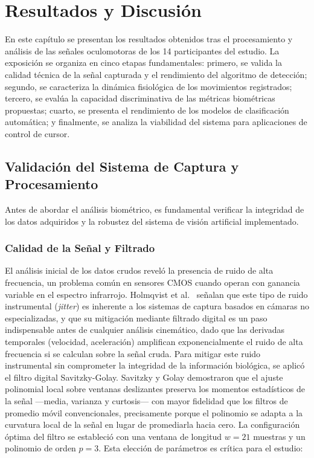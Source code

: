 \chapter{Resultados y Discusión}

En este capítulo se presentan los resultados obtenidos tras el procesamiento y análisis de las señales oculomotoras de los 14 participantes del estudio.
La exposición se organiza en cinco etapas fundamentales: primero, se valida la calidad técnica de la señal capturada y el rendimiento del algoritmo de detección;
segundo, se caracteriza la dinámica fisiológica de los movimientos registrados;
tercero, se evalúa la capacidad discriminativa de las métricas biométricas propuestas;
cuarto, se presenta el rendimiento de los modelos de clasificación automática;
y finalmente, se analiza la viabilidad del sistema para aplicaciones de control de cursor.
\section{Validación del Sistema de Captura y Procesamiento}

Antes de abordar el análisis biométrico, es fundamental verificar la integridad de los datos adquiridos y la robustez del sistema de visión artificial implementado.
\subsection{Calidad de la Señal y Filtrado}

El análisis inicial de los datos crudos reveló la presencia de ruido de
alta frecuencia, un problema común en sensores CMOS cuando operan con
ganancia variable en el espectro infrarrojo.
Holmqvist et al.\
\cite{holmqvist2011eye} señalan que este tipo de ruido 
instrumental (\textit{jitter}) es inherente a los sistemas de captura basados en cámaras
no especializadas, y que su mitigación mediante filtrado digital es un
paso indispensable antes de cualquier análisis cinemático, dado que las
derivadas temporales (velocidad, aceleración) amplifican exponencialmente
el ruido de alta frecuencia si se calculan sobre la señal cruda.
Para mitigar este ruido instrumental  sin comprometer la integridad de la
información biológica, se aplicó el filtro digital Savitzky-Golay.
Savitzky y Golay \cite{savitzky1964smoothing} demostraron que el ajuste
polinomial local sobre ventanas deslizantes preserva los momentos
estadísticos de la señal —media, varianza y curtosis— con mayor fidelidad
que los filtros de promedio móvil convencionales, precisamente porque el
polinomio se adapta a la curvatura local de la señal en lugar de
promediarla hacia cero.
La configuración óptima del filtro se estableció
con una ventana de longitud $w=21$ muestras y un polinomio de orden
$p=3$.
Esta elección de parámetros es crítica para el estudio:

